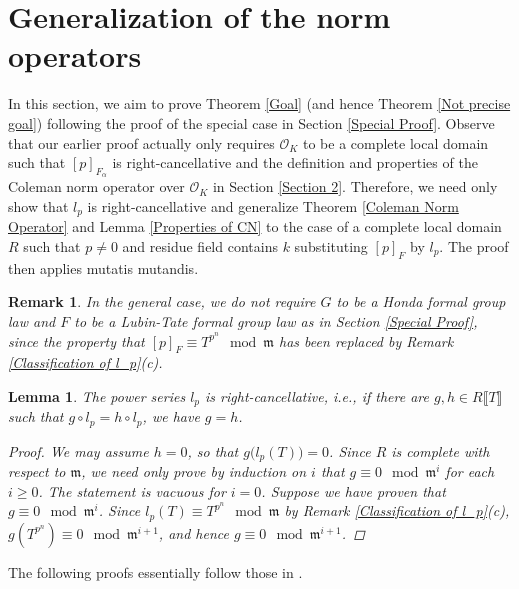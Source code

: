 \documentclass[12pt]{article}
\newtheorem{lemma}[theorem]{Lemma}
\newtheorem{remark}[theorem]{Remark}
\theoremstyle{definition}
\newcommand{\PS}[1]{\llbracket #1 \rrbracket}
\def\m{\mathfrak{m}}
\def\O{\mathcal{O}}
\begin{document}
    \section{Generalization of the norm operators}
    In this section, we aim to prove Theorem \ref{Goal} (and hence Theorem \ref{Not precise goal}) following the proof of the special case in Section \ref{Special Proof}. Observe that our earlier proof actually only requires $\O_K$ to be a complete local domain such that $[p]_{F_\alpha}$ is right-cancellative and the definition and properties of the Coleman norm operator over $\O_K$ in Section \ref{Section 2}. Therefore, we need only show that $l_p$ is right-cancellative and generalize Theorem \ref{Coleman Norm Operator} and Lemma \ref{Properties of CN} to the case of a complete local domain $R$ such that $p \neq 0$ and residue field contains $k$ substituting $[p]_F$ by $l_p$. The proof then applies mutatis mutandis. 
    \begin{remark}
        In the general case, we do not require $G$ to be a Honda formal group law and $F$ to be a Lubin-Tate formal group law as in Section \ref{Special Proof}, since the property that $[p]_F \equiv T^{p^n} \mod{\m}$ has been replaced by Remark \ref{Classification of l_p}(c). 
    \end{remark}
    \begin{lemma} \label{l_p can be cancaled from right}
        The power series $l_p$ is right-cancellative, i.e., if there are $g,h \in R\PS{T}$ such that $g \circ l_p = h \circ l_p$, we have $g = h$. 
        \begin{proof}
            We may assume $h = 0$, so that $g\bigl(l_p(T)\bigr) = 0$. Since $R$ is complete with respect to $\m$, we need only prove by induction on $i$ that $g \equiv 0 \mod{\m^i}$ for each $i \geqslant 0$. The statement is vacuous for $i = 0$. Suppose we have proven that $g \equiv 0 \mod{\m^i}$. Since $l_p(T) \equiv T^{p^n} \mod{\m}$ by Remark \ref{Classification of l_p}(c), $g(T^{p^n}) \equiv 0 \mod{\m^{i+1}}$, and hence $g \equiv 0 \mod{\m^{i+1}}$. 
        \end{proof}
    \end{lemma}
    The following proofs essentially follow those in \cite{Col79}. 
\end{document}

